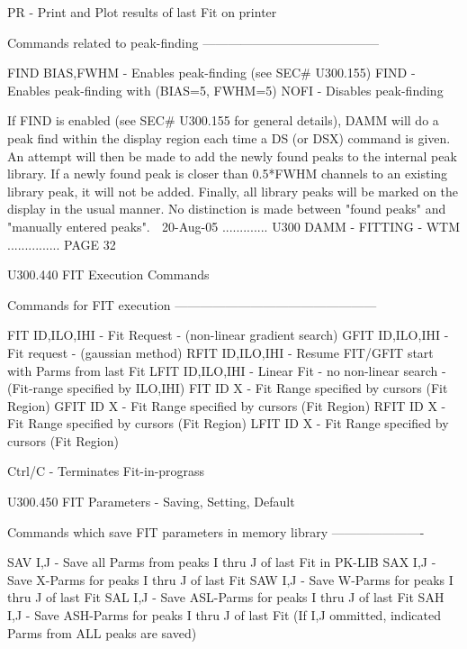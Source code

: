    PR                 - Print and Plot results of last Fit on printer
 
   Commands related to peak-finding ------------------------------------------
 
   FIND  BIAS,FWHM    - Enables  peak-finding (see SEC# U300.155)
   FIND               - Enables  peak-finding with (BIAS=5, FWHM=5)
   NOFI               - Disables peak-finding
 
   If FIND is enabled (see SEC# U300.155 for general details), DAMM will do  a
   peak  find  within  the  display  region each time a DS (or DSX) command is
   given. An attempt will then be made to add the newly  found  peaks  to  the
   internal  peak  library.  If  a  newly  found  peak is closer than 0.5*FWHM
   channels to an existing library peak, it will not be  added.  Finally,  all
   library  peaks  will  be  marked  on  the  display  in the usual manner. No
   distinction is made between "found peaks" and "manually entered peaks".
    
   20-Aug-05 ............. U300  DAMM - FITTING - WTM ............... PAGE  32
 
   U300.440  FIT Execution Commands
 
   Commands for FIT execution ------------------------------------------------
 
   FIT    ID,ILO,IHI  - Fit Request - (non-linear gradient search)
   GFIT   ID,ILO,IHI  - Fit request - (gaussian method)
   RFIT   ID,ILO,IHI  - Resume FIT/GFIT start with Parms from last Fit
   LFIT   ID,ILO,IHI  - Linear Fit - no non-linear search
                      - (Fit-range specified by ILO,IHI)
   FIT    ID X        - Fit Range specified by cursors (Fit Region)
   GFIT   ID X        - Fit Range specified by cursors (Fit Region)
   RFIT   ID X        - Fit Range specified by cursors (Fit Region)
   LFIT   ID X        - Fit Range specified by cursors (Fit Region)
 
   Ctrl/C             - Terminates Fit-in-prograss
 
   U300.450  FIT Parameters - Saving, Setting, Default
 
   Commands which save FIT parameters in memory library ----------------------
 
   SAV    I,J  - Save all Parms from peaks I thru J of last Fit in PK-LIB
   SAX    I,J  - Save X-Parms   for  peaks I thru J of last Fit
   SAW    I,J  - Save W-Parms   for  peaks I thru J of last Fit
   SAL    I,J  - Save ASL-Parms for  peaks I thru J of last Fit
   SAH    I,J  - Save ASH-Parms for  peaks I thru J of last Fit
   (If I,J ommitted, indicated Parms from ALL peaks are saved)
 
